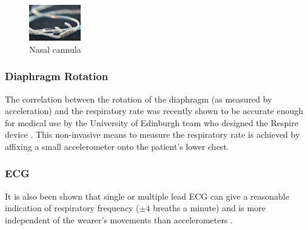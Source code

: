 \begin{figure}
  \vspace{-10pt}
  \begin{center}
    \includegraphics[width=0.2\textwidth, keepaspectratio=true]{images/nasal_canula.png}
  \end{center}
  \caption[Face Mask]{Nasal cannula \cite{SpecknetFlyer}}
  \vspace{-10pt}
\end{figure}

\subsubsection{Diaphragm Rotation}
The correlation between the rotation of the diaphragm (as measured by acceleration) and the
respiratory rate was recently shown to be accurate enough for medical use by the University of
Edinburgh team who designed the Respire device \cite{BatesLingMannArvind2010}. This non-invasive
means to measure the respiratory rate is achieved by affixing a small accelerometer onto
the patient's lower chest.


\subsubsection{\acf{ECG}}
It is also been shown that single or multiple lead \ac{ECG} can give a reasonable indication of respiratory
frequency ($\pm4$ breaths a minute) and is more independent of the wearer's movements than
accelerometers \cite{ZhaoZhaoQun2008, BoyleBidargaddiSarelaKarunanithi2009}.

